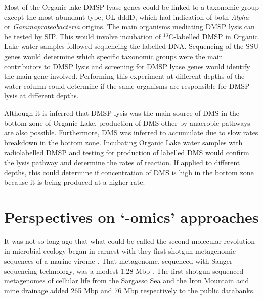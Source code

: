 Most of the Organic lake \ac{DMSP} lyase genes could be linked to a taxonomic group except the most abundant type, OL-dddD, which had indication of both \emph{Alpha}- or \emph{Gammaproteobacteria} origins.
The main organisms mediating \ac{DMSP} lysis can be tested by \ac{SIP}.
This would involve incubation of $^13$C-labelled \ac{DMSP} in Organic Lake water samples followed sequencing the labelled \ac{DNA}.
Sequencing of the \ac{SSU} genes would determine which specific taxonomic groups were the main contributors to \ac{DMSP} lysis and screening for \ac{DMSP} lyase genes would identify the main gene involved.
Performing this experiment at different depths of the water column could determine if the same organisms are responsible for \ac{DMSP} lysis at different depths.

Although it is inferred that \ac{DMSP} lysis was the main source of \ac{DMS} in the bottom zone of Organic Lake, production of \ac{DMS} other by anaerobic pathways are also possible.
Furthermore, \ac{DMS} was inferred to accumulate due to slow rates breakdown in the bottom zone.
Incubating Organic Lake water samples with radiolabelled \ac{DMSP} and testing for production of labelled \ac{DMS} would confirm the lysis pathway and determine the rates of reaction.
If applied to different depths, this could determine if concentration of \ac{DMS} is high in the bottom zone because it is being produced at a higher rate.


\section{Perspectives on `-omics' approaches }
It was not so long ago that what could be called the second molecular revolution in microbial ecology began in earnest with they first shotgun metagenomic sequences of a marine virome \cite{Breitbart2002}.
That metagenome, sequenced with Sanger sequencing technology, was a modest 1.28 Mbp \cite{Breitbart2002}.
The first shotgun sequenced metagenomes of cellular life from the Sargasso Sea \cite{Venter2004} and the Iron Mountain acid mine drainage \cite{Tyson2004} added 265 Mbp and 76 Mbp respectively to the public databanks.

